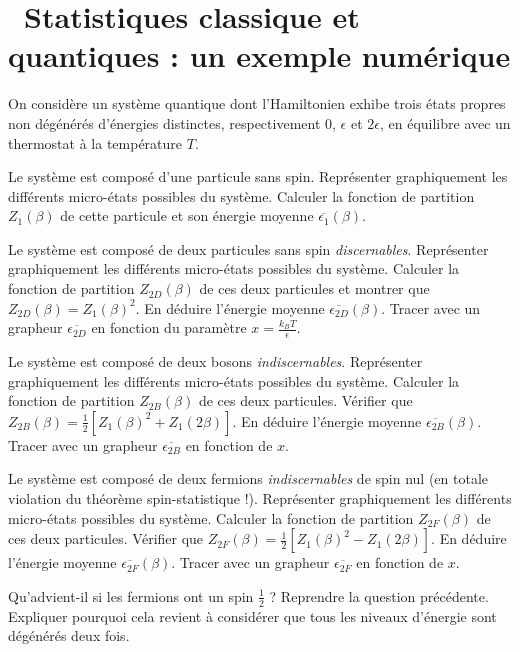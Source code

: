 \documentclass[utf8, 11pt]{feuille}
\begin{document}




\section{\medium~Statistiques classique et quantiques : un exemple numérique}

On considère un système quantique dont l'Hamiltonien exhibe trois états propres non dégénérés d'énergies distinctes, respectivement 0, $\epsilon$ et $2\epsilon$, en équilibre avec un thermostat à la température $T$.

\medskip

\question
Le système est composé d'une particule sans spin. Représenter graphiquement les différents micro-états possibles du système. Calculer la fonction de partition $Z_1(\beta)$ de cette particule et son énergie moyenne $\overline{\epsilon_1}(\beta)$.

\question
Le système est composé de deux particules sans spin \textit{discernables}. Représenter graphiquement les différents micro-états possibles du système. Calculer la fonction de partition $Z_{2D}(\beta)$ de ces deux particules et montrer que  $Z_{2D}(\beta)=Z_1(\beta)^2$. En déduire l'énergie moyenne $\overline{\epsilon_{2D}}(\beta)$. Tracer  avec un grapheur $\overline{\epsilon_{2D}}$ en fonction du paramètre $x=\frac{k_BT}{\epsilon}$. 

\question
Le système est composé de deux bosons \textit{indiscernables}. Représenter graphiquement les différents micro-états possibles du système. Calculer la fonction de partition $Z_{2B}(\beta)$ de ces deux particules. Vérifier que  $Z_{2B}(\beta)=\frac{1}{2} [Z_1(\beta)^2+Z_1(2\beta)]$. En déduire l'énergie moyenne $\overline{\epsilon_{2B}}(\beta)$. Tracer  avec un grapheur $\overline{\epsilon_{2B}}$ en fonction de $x$. 

\question
Le système est composé de deux fermions \textit{indiscernables} de spin nul (en totale violation du théorème spin-statistique !). Représenter graphiquement les différents micro-états possibles du système. Calculer la fonction de partition $Z_{2F}(\beta)$ de ces deux particules. Vérifier que  $Z_{2F}(\beta)=\frac{1}{2} [Z_1(\beta)^2-Z_1(2\beta)]$. En déduire l'énergie moyenne $\overline{\epsilon_{2F}}(\beta)$. Tracer  avec un grapheur $\overline{\epsilon_{2F}}$ en fonction de $x$. 

\question
Qu'advient-il si les fermions ont un spin $\frac{1}{2}$ ? Reprendre la question précédente. Expliquer pourquoi cela revient à considérer que tous les niveaux d'énergie sont dégénérés deux fois.
\end{document}
